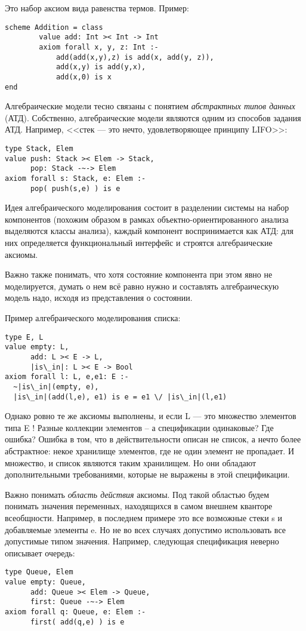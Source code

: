 Это набор аксиом вида равенства термов. Пример:
\begin{lstlisting}
scheme Addition = class
        value add: Int >< Int -> Int
        axiom forall x, y, z: Int :-
            add(add(x,y),z) is add(x, add(y, z)),
            add(x,y) is add(y,x),
            add(x,0) is x
end
\end{lstlisting}

Алгебраические модели тесно связаны с понятием \emph{абстрактных типов данных} (АТД). Собственно, алгебраические модели являются одним из способов задания АТД. Например, <<стек --- это нечто, удовлетворяющее принципу LIFO>>:
\begin{lstlisting}
type Stack, Elem
value push: Stack >< Elem -> Stack,
      pop: Stack -~-> Elem
axiom forall s: Stack, e: Elem :-
      pop( push(s,e) ) is e
\end{lstlisting}

Идея алгебраического моделирования состоит в разделении системы на набор компонентов (похожим образом в рамках объектно-ориентированного анализа выделяются классы анализа), каждый компонент воспринимается как АТД: для них определяется функциональный интерфейс и строятся алгебраические аксиомы.

Важно также понимать, что хотя состояние компонента при этом явно не моделируется, думать о нем всё равно нужно и составлять алгебраическую модель надо, исходя из представления о состоянии.

Пример алгебраического моделирования списка:
\begin{lstlisting}[escapechar={|}]
type E, L
value empty: L,
      add: L >< E -> L,
      |is\_in|: L >< E -> Bool
axiom forall l: L, e,e1: E :-
  ~|is\_in|(empty, e),
  |is\_in|(add(l,e), e1) is e = e1 \/ |is\_in|(l,e1)
\end{lstlisting}

Однако ровно те же аксиомы выполнены, и если L --- это множество элементов типа E ! Разные коллекции элементов -- а спецификации одинаковые? Где ошибка? Ошибка в том, что в действительности описан не список, а нечто более абстрактное: некое хранилище элементов, где не один элемент не пропадает. И множество, и список являются таким хранилищем. Но они обладают дополнительными требованиями, которые не выражены в этой спецификации.


Важно понимать \emph{область действия} аксиомы. Под такой областью будем понимать значения переменных, находящихся в самом внешнем кванторе всеобщности. Например, в последнем примере это все возможные стеки s и добавляемые элементы e. Но не во всех случаях допустимо использовать все допустимые типом значения. Например, следующая спецификация неверно описывает очередь:
\begin{lstlisting}
type Queue, Elem
value empty: Queue,
      add: Queue >< Elem -> Queue,
      first: Queue -~-> Elem
axiom forall q: Queue, e: Elem :-
      first( add(q,e) ) is e
\end{lstlisting}

